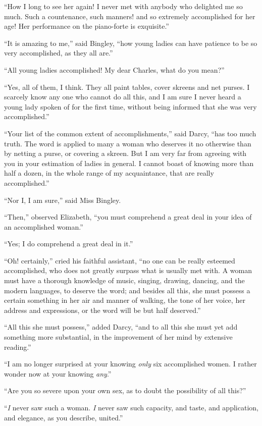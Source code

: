 “How I long to see her again! I never met with
anybody who delighted me so much. Such a countenance,
such manners! and so extremely accomplished for her
age! Her performance on the piano-forte is exquisite.”

“It is amazing to me,” said Bingley, “how young
ladies can have patience to be so very accomplished, as
they all are.”

“All young ladies accomplished! My dear Ch\-arles, what
do you mean?”

“Yes, all of them, I think. They all paint tables,
cover skreens and net purses. I scarcely know any one
who cannot do all this, and I am sure I never heard
a young lady spoken of for the first time, without being
informed that she was very accomplished.”

“Your list of the common extent of accomplishments,”
said Darcy, “has too much truth. The word is applied
to many a woman who deserves it no otherwise than by
netting a purse, or covering a skreen. But I am very far
from agreeing with you in your estimation of ladies in
general. I cannot boast of knowing more than half a dozen,
in the whole range of my acquaintance, that are really
accomplished.”

“Nor I, I am sure,” said Miss Bingley.

“Then,” observed Elizabeth, “you must comprehend
a great deal in your idea of an accomplished woman.”

“Yes; I do comprehend a great deal in it.”

“Oh! certainly,” cried his faithful assistant, “no one
can be really esteemed accomplished, who does not greatly
surpass what is usually met with. A woman must have
a thorough knowledge of music, singing, drawing, dancing,
and the modern languages, to deserve the word; and besides
all this, she must possess a certain something in her
air and manner of walking, the tone of her voice, her address
and expressions, or the word will be but half deserved.”

“All this she must possess,” added Darcy, “and to
all this she must yet add something more substantial, in
the improvement of her mind by extensive reading.”

“I am no longer surprised at your knowing \textit{only} six
accomplished women. I rather wonder now at your
knowing \textit{any}.”

“Are you so severe upon your own sex, as to doubt the
possibility of all this?”

“\textit{I} never saw such a woman. \textit{I} never saw such capacity,
and taste, and application, and elegance, as you describe,
united.”

